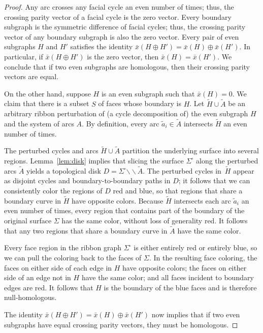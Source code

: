 \documentclass[letterpaper,review]{siamart190516}
\def\snip{\mathbin{\raisebox{0.15ex}{\rotatebox[origin=c]{60}{\Rightscissors}\!}}}
\def\snip{\mathbin{\backslash\!\!\backslash}}
\def\anote#1{\color{purple}Amir: #1 \color{black}}
\begin{document}
\begin{proof}
Any arc crosses any facial cycle an even number of times; thus, the crossing parity vector of a facial cycle is the zero vector.  Every boundary subgraph is the symmetric difference of facial cycles; thus, the crossing parity vector of any boundary subgraph is also the zero vector.  Every pair of even subgraphs $H$ and $H'$ satisfies the identity $\bar{x}(H\oplus H') = \bar{x}(H) \oplus \bar{x}(H')$.  In particular, if $\bar{x}(H\oplus H')$ is the zero vector, then $\bar{x}(H) = \bar{x}(H')$.  We conclude that if two even subgraphs are homologous, then their crossing parity vectors are equal.

On the other hand, suppose $H$ is an even subgraph such that $\bar{x}(H) = 0$.  We claim that there is a subset $S$ of faces whose boundary is $H$.  Let $\tilde{H} \cup \tilde{A}$ be an arbitrary ribbon perturbation of (a cycle decomposition of) the even subgraph $H$ and the system of arcs $A$.  By definition, every arc $\tilde{a}_i\in \tilde{A}$ intersects $\tilde{H}$ an even number of times.

The perturbed cycles and arcs $\tilde{H} \cup \tilde{A}$ partition the underlying surface into several regions.  Lemma~\ref{lem:disk} implies that slicing the surface $\Sigma^\square$ along the perturbed arcs $\tilde{A}$ yields a topological disk $D = \Sigma^\square\snip\tilde{A}$.  The perturbed cycles in~$\tilde{H}$ appear as disjoint cycles and boundary-to-boundary paths in $D$; it follows that we can consistently color the regions of $D$ red and blue, so that regions that share a boundary curve in $\tilde{H}$ have opposite colors.  Because $\tilde{H}$ intersects each arc $\tilde{a}_i$ an even number of times, every region that contains part of the boundary of the original surface $\Sigma$ has the same color, without loss of generality red.  It follows that any two regions that share a boundary curve in $\tilde{A}$ have the same color.

Every face region in the ribbon graph $\Sigma^\square$ is either entirely red or entirely blue, so we can pull the coloring back to the faces of $\Sigma$.  In the resulting face coloring, the faces on either side of each edge in $H$ have opposite colors; the faces on either side of an edge not in $H$ have the same color; and all faces incident to boundary edges are red.  It follows that $H$ is the boundary of the blue faces and is therefore null-homologous.

The identity $\bar{x}(H\oplus H') = \bar{x}(H) \oplus \bar{x}(H')$ now implies that if two even subgraphs have equal crossing parity vectors, they must be homologous.
\end{proof}
\end{document}
